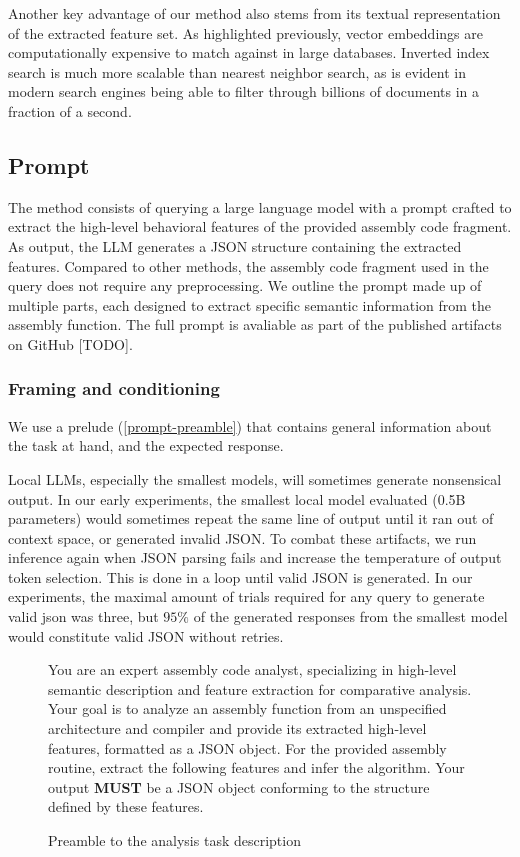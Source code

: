 Another key advantage of our method also stems from its textual representation of the extracted feature set. As highlighted
previously, vector embeddings are computationally expensive to match against in large databases. Inverted index search is much
more scalable than nearest neighbor search, as is evident in modern search engines being able to filter through billions of documents
in a fraction of a second.

\subsection{Prompt}

The method consists of querying a large language model with a prompt crafted to extract the high-level behavioral features of
the provided assembly code fragment. As output, the LLM generates a JSON structure containing the extracted features.
Compared to other methods, the assembly code fragment used in the query does not require any preprocessing.
We outline the prompt made up of multiple parts, each designed to extract specific semantic information from the
assembly function. The full prompt is avaliable as part of the published artifacts on GitHub [TODO].

\subsubsection{Framing and conditioning}

We use a prelude (\autoref{prompt-preamble}) that contains general information about the task at hand, and the expected response.

Local LLMs, especially the smallest models, will sometimes generate nonsensical output. In our early experiments, the smallest local model
evaluated (0.5B parameters) would sometimes repeat the same line of output until it ran out of context space, or generated invalid JSON.
To combat these artifacts, we run inference again when JSON parsing fails and increase the temperature of output token
selection. This is done in a loop until valid JSON is generated. In our experiments, the maximal amount of trials required
for any query to generate valid json was three, but \(95\%\) of the generated responses from the smallest model would constitute
valid JSON without retries.

\begin{figure}
\centering
\begin{tcolorbox}[enhanced]
You are an expert assembly code analyst, specializing in high-level semantic description and feature extraction for comparative
analysis. Your goal is to analyze an assembly function from an unspecified architecture and compiler and provide its extracted
high-level features, formatted as a JSON object. For the provided assembly routine, extract the following features and infer the
algorithm. Your output \textbf{MUST} be a JSON object conforming to the structure defined by these features.
\end{tcolorbox}
\caption{Preamble to the analysis task description}
\label{prompt-preamble}
\end{figure}

